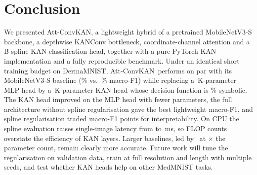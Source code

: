 \documentclass[conference]{IEEEtran}
\newcommand{\ours}{Att-ConvKAN}
\begin{document}
\section{Conclusion}
We presented \ours, a lightweight hybrid of a pretrained MobileNetV3-S backbone, a depthwise KANConv bottleneck, coordinate-channel attention and a B-spline KAN classification head, together with a pure-PyTorch KAN implementation and a fully reproducible benchmark. Under an identical short training budget on DermaMNIST, \ours\ performs on par with its MobileNetV3-S baseline (\% vs.\ \% macro-F1) while replacing a \,K-parameter MLP head by a \,K-parameter KAN head whose decision function is \% symbolic. The KAN head improved on the MLP head with fewer parameters, the full architecture without spline regularisation gave the best lightweight macro-F1, and spline regularisation traded  macro-F1 points for interpretability. On CPU the spline evaluation raises single-image latency from  to \,ms, so FLOP counts overstate the efficiency of KAN layers. Larger baselines, led by \bestbaselinename\ at $\times$ the parameter count, remain clearly more accurate. Future work will tune the regularisation on validation data, train at full resolution and length with multiple seeds, and test whether KAN heads help on other MedMNIST tasks.
\end{document}
